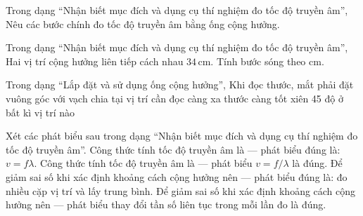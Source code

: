 \begin{ex}
Trong dạng “Nhận biết mục đích và dụng cụ thí nghiệm đo tốc độ truyền âm”, Nêu các bước chính đo tốc độ truyền âm bằng ống cộng hưởng.
\choiceTF

\end{ex}

\begin{ex}
Trong dạng “Nhận biết mục đích và dụng cụ thí nghiệm đo tốc độ truyền âm”, Hai vị trí cộng hưởng liên tiếp cách nhau $34\,\text{cm}$. Tính bước sóng theo cm.
\end{ex}

\begin{ex}
Trong dạng “Lắp đặt và sử dụng ống cộng hưởng”, Khi đọc thước, mắt phải đặt
\choice
{\True vuông góc với vạch chia tại vị trí cần đọc}
{càng xa thước càng tốt}
{xiên 45 độ}
{ở bất kì vị trí nào}
\end{ex}

\begin{ex}
Xét các phát biểu sau trong dạng “Nhận biết mục đích và dụng cụ thí nghiệm đo tốc độ truyền âm”.
\choiceTF
{\True Công thức tính tốc độ truyền âm là — phát biểu đúng là: $v=f\lambda$.}
{Công thức tính tốc độ truyền âm là — phát biểu $v=f/\lambda$ là đúng.}
{\True Để giảm sai số khi xác định khoảng cách cộng hưởng nên — phát biểu đúng là: đo nhiều cặp vị trí và lấy trung bình.}
{Để giảm sai số khi xác định khoảng cách cộng hưởng nên — phát biểu thay đổi tần số liên tục trong mỗi lần đo là đúng.}
\end{ex}

